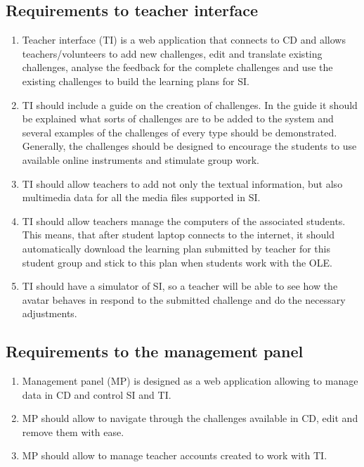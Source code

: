 \documentclass[a4paper]{article}
\begin{document}
\subsection{Requirements to teacher interface}

\begin{enumerate}
\item Teacher interface (TI) is a web application that connects to CD and allows teachers/volunteers to add new challenges, edit and translate existing challenges, analyse the feedback for the complete challenges and use the existing challenges to build the learning plans for SI.

\item TI should include a guide on the creation of challenges. In the guide it should be explained what sorts of challenges are to be added to the system and several examples of the challenges of every type should be demonstrated. Generally, the challenges should be designed to encourage the students to use available online instruments and stimulate group work.

\item TI should allow teachers to add not only the textual information, but also multimedia data for all the media files supported in SI.

\item TI should allow teachers manage the computers of the associated students. This means, that after student laptop connects to the internet, it should automatically download the learning plan submitted by teacher for this student group and stick to this plan when students work with the OLE.

\item TI should have a simulator of SI, so a teacher will be able to see how the avatar behaves in respond to the submitted challenge and do the necessary adjustments.
\end{enumerate}


\subsection{Requirements to the management panel}

\begin{enumerate}
\item Management panel (MP) is designed as a web application allowing to manage data in CD and control SI and TI. 

\item MP should allow to navigate through the challenges available in CD, edit and remove them with ease.

\item MP should allow to manage teacher accounts created to work with TI.
\end{enumerate}
\end{document}
